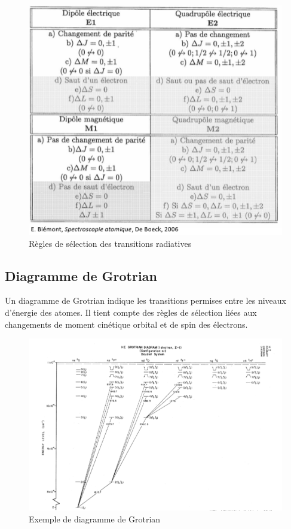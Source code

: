 \begin{figure}[h!]
    \centering
    \includegraphics[scale=0.8]{Images2/regles.PNG}
    \caption{Règles de sélection des transitions radiatives}
    \label{fig:regles_transision_radiatives}
\end{figure}

\subsection{Diagramme de Grotrian}

Un diagramme de Grotrian indique les transitions permises entre les niveaux d'énergie des atomes. Il tient compte des règles de sélection liées aux changements de moment cinétique orbital et de spin des électrons.

\begin{figure}[h!]
    \centering
    \includegraphics[scale=0.5]{Images2/grotrian.PNG}
    \caption{Exemple de diagramme de Grotrian}
    \label{fig:grotrian}
\end{figure}






